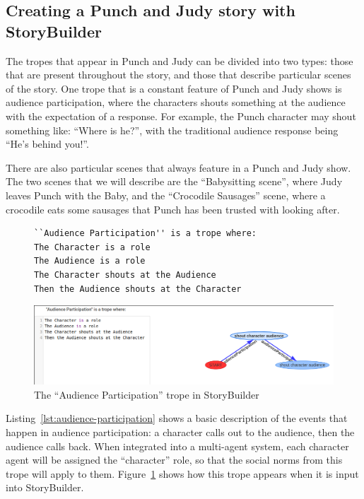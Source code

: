 \documentclass[11pt]{report}
\begin{document}
\subsection{Creating a Punch and Judy story with StoryBuilder}
The tropes that appear in Punch and Judy can be divided into two types: those
that are present throughout the story, and those that describe particular scenes
of the story. One trope that is a constant feature of Punch and Judy shows is
audience participation, where the characters shouts something at the audience
with the expectation of a response. For example, the Punch character may shout
something like: ``Where is he?'', with the traditional audience response being
``He's behind you!''.

There are also particular scenes that always feature in a Punch and Judy show.
The two scenes that we will describe are the ``Babysitting scene'', where Judy leaves Punch with the
Baby, and the ``Crocodile Sausages'' scene, where a crocodile eats some sausages
that Punch has been trusted with looking after.

\begin{figure}[!t]
\begin{lstlisting}[label={lst:audience-participation},caption={The ``Audience participation'' trope}]
``Audience Participation'' is a trope where:
The Character is a role
The Audience is a role
The Character shouts at the Audience
Then the Audience shouts at the Character
\end{lstlisting}

\smallskip

\centerline{\includegraphics[width=\textwidth]{audience-trope.png}}
\caption{The ``Audience Participation'' trope in StoryBuilder}\label{fig:audience-participation}
\end{figure}

Listing~\ref{lst:audience-participation} shows a basic description of the events
that happen in audience participation: a character calls out to the audience,
then the audience calls back. When integrated into a multi-agent system, each
character agent will be assigned the ``character'' role, so that the social
norms from this trope will apply to them.
Figure~\ref{fig:audience-participation} shows how this trope appears when it is
input into StoryBuilder.
\end{document}
